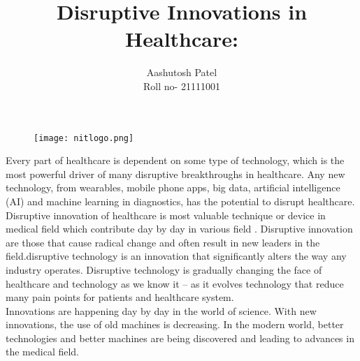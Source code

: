 \documentclass[a4paper,12pt]{article}
\author{Aashutosh Patel \\ Roll no- 21111001}
\begin{document}
	\begin{figure}
		\centering
		\texttt{[image: nitlogo.png]}
	\end{figure}
	\maketitle
	\clearpage
	
	{\huge \centering \title {Disruptive Innovations in Healthcare:}}
	
	Every part of healthcare is dependent on some type of technology, which
	is the most powerful driver of many disruptive breakthroughs in healthcare. Any
	new technology, from wearables, mobile phone apps, big data, artificial
	intelligence (AI) and machine learning in diagnostics, has the potential to disrupt healthcare.
	\\
	Disruptive innovation of healthcare is most valuable technique
	or device in medical field which contribute day by day in
	various field . Disruptive innovation are those that cause
	radical change and often result in new leaders in the
	field.disruptive technology is an innovation that significantly
	alters the way any industry
	operates. Disruptive technology is gradually changing the face
	of healthcare and technology as we know it – as it evolves
	technology that reduce many pain points for patients and
	healthcare system.
	\\
	Innovations are happening day by day in the world of science. With new innovations, the use of old machines is decreasing. In the modern world, better
	technologies and better machines are being discovered and leading to advances
	in the medical field.
	\\
	
\end{document}
